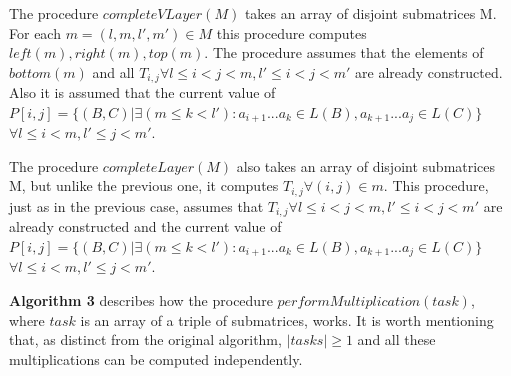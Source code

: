 \documentclass{article}
\begin{document}
 The procedure $completeVLayer(M)$ takes an array of disjoint submatrices M. For each $m = (l, m, l', m') \in M$ this procedure computes $left(m), right(m), top(m)$. The procedure assumes that the elements of $bottom(m)$ and all $T_{i, j} \forall l \leq i < j < m,  l' \leq i < j < m'$ are already constructed. Also it is assumed that the current value of  $P[i, j] =  \{ (B, C) |\exists (m \le k < l'): a_{i + 1}...a_{k} \in L(B), a_{k + 1}...a_{j} \in L(C)\}$ $\forall l \leq i < m,  l' \leq j < m'$.
 
 The procedure $completeLayer(M)$ also takes an array of disjoint submatrices M, but unlike the previous one, it computes $T_{i, j} \forall (i, j) \in m$. This procedure, just as in the previous case, assumes that  $T_{i, j} \forall l \leq i < j < m,  l' \leq i < j < m'$ are already constructed and the current value of  $P[i, j] =  \{ (B, C) |\exists (m \le k < l'): a_{i + 1}...a_{k} \in L(B), a_{k + 1}...a_{j} \in L(C)\}$ $\forall l \leq i < m,  l' \leq j < m'$.
 
 \textbf{Algorithm 3} describes how the procedure $performMultiplication(task)$, where $task$ is an array of a triple of submatrices, works. It is worth mentioning that, as distinct from the original algorithm, $|tasks| \ge 1$ and all these multiplications can be computed independently.
 
\end{document}
